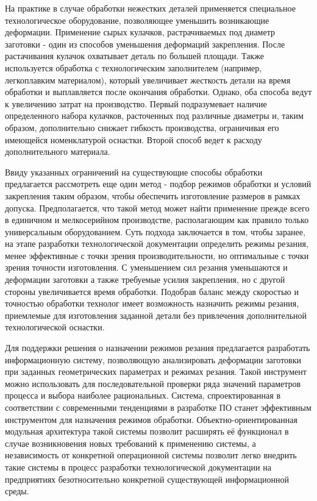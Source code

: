 \documentclass[14pt,oneside,final]{extreport}
\begin{document}
	На практике в случае обработки нежестких деталей применяется специальное технологическое оборудование, позволяющее уменьшить возникающие деформации. Применение сырых кулачков, растрачиваемых под диаметр заготовки - один из способов уменьшения деформаций закрепления. После растачивания кулачок охватывает деталь по большей площади. Также используется обработка с технологическим заполнителем (например, легкоплавким материалом), который увеличивает жесткость детали на время обработки и выплавляется после окончания обработки. Однако, оба способа ведут к увеличению затрат на производство. Первый подразумевает наличие определенного набора кулачков, расточенных под различные диаметры и, таким образом, дополнительно снижает гибкость производства, ограничивая его имеющейся номенклатурой оснастки. Второй способ ведет к расходу дополнительного материала. 
	
	Ввиду указанных ограничений на существующие способы обработки предлагается рассмотреть еще один метод - подбор режимов обработки и условий закрепления таким образом, чтобы обеспечить изготовление размеров в рамках допуска. Предполагается, что такой метод может найти применение прежде всего в единичном и мелкосерийном производстве, располагающим как правило только универсальным оборудованием. Суть подхода заключается в том, чтобы заранее, на этапе разработки технологической документации определить режимы резания, менее эффективные с точки зрения производительности, но оптимальные с точки зрения точности изготовления. С уменьшением сил резания уменьшаются и деформации заготовки а также требуемые усилия закрепления, но с другой стороны увеличивается время обработки.  Подобрав баланс между скоростью и точностью обработки технолог имеет возможность назначить режимы резания, приемлемые для изготовления заданной детали без привлечения дополнительной технологической оснастки. 
	
	Для поддержки решения о назначении режимов резания предлагается разработать информационную систему, позволяющую анализировать деформации заготовки при заданных геометрических параметрах и режимах резания. Такой инструмент можно использовать для последовательной проверки ряда значений параметров процесса и выбора наиболее рациональных. 
	Система, спроектированная в соответствии с современными тенденциями в разработке ПО станет эффективным инструментом для назначения режимов обработки. Объектно-ориентированная модульная архитектура такой системы позволит расширять её функционал в случае возникновения новых требований к применению системы, а независимость от конкретной операционной системы позволит легко внедрить такие системы в процесс разработки технологической документации на предприятиях безотносительно конкретной существующей информационной среды.
	
\end{document}
